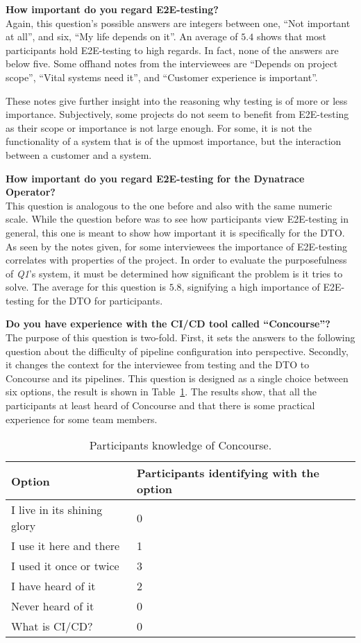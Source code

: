 \textbf{How important do you regard E2E-testing?}\\
Again, this question's possible answers are integers between one, ``Not important at all'', and six, ``My life depends on it''.
An average of $5.4$ shows that most participants hold E2E-testing to high regards.
In fact, none of the answers are below five.
Some offhand notes from the interviewees are ``Depends on project scope'', ``Vital systems need it'', and ``Customer experience is important''.

These notes give further insight into the reasoning why testing is of more or less importance.
Subjectively, some projects do not seem to benefit from E2E-testing as their scope or importance is not large enough.
For some, it is not the functionality of a system that is of the upmost importance, but the interaction between a customer and a system.

\textbf{How important do you regard E2E-testing for the Dynatrace Operator?}\\
This question is analogous to the one before and also with the same numeric scale.
While the question before was to see how participants view E2E-testing in general, this one is meant to show how important it is specifically for the DTO.
As seen by the notes given, for some interviewees the importance of E2E-testing correlates with properties of the project.
In order to evaluate the purposefulness of \textit{Q1}'s system, it must be determined how significant the problem is it tries to solve.
The average for this question is $5.8$, signifying a high importance of E2E-testing for the DTO for participants.

\textbf{Do you have experience with the CI/CD tool called ``Concourse''?}\\
The purpose of this question is two-fold.
First, it sets the answers to the following question about the difficulty of pipeline configuration into perspective.
Secondly, it changes the context for the interviewee from testing and the DTO to Concourse and its pipelines.
This question is designed as a single choice between six options, the result is shown in Table~\ref{tab:participants-knowledge-of-concourse}.
The results show, that all the participants at least heard of Concourse and that there is some practical experience for some team members.

\begin{table}[H]
    \centering
    \caption{Participants knowledge of Concourse.}
    \label{tab:participants-knowledge-of-concourse}
    \begin{tabular}{l|l}
        Option & Participants identifying with the option \\
        \hline
        I live in its shining glory & 0 \\
        I use it here and there & 1 \\
        I used it once or twice & 3 \\
        I have heard of it & 2 \\
        Never heard of it & 0 \\
        What is CI/CD? & 0 \\
    \end{tabular}
\end{table}

